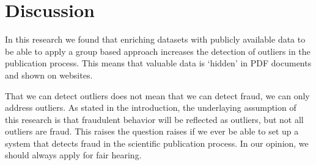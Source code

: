 \documentclass{ou-report}
\begin{document}


\section{Discussion}
\label{sec:discussion}



In this research we found that enriching datasets with publicly available data 
to be able to apply a group based approach increases the detection of 
outliers in the publication process. This means that 
valuable data is `hidden’ in PDF documents and shown on websites. 

That we can detect outliers does not mean that we can detect fraud, we can only address outliers. As 
stated in the introduction, the underlaying assumption of this research is that 
fraudulent behavior will be reflected as outliers, but not all outliers are 
fraud. This raises the question raises if we ever be able to set up a system 
that detects fraud in the scientific publication process. In our opinion, we 
should always apply for fair hearing.
\end{document}
